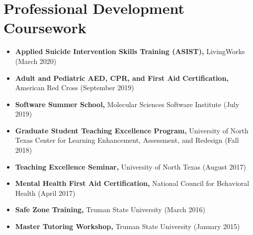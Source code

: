 \documentclass[letterpaper,11pt]{article}
\newcommand{\resumeItem}[2]{
  \item\small{
    \textbf{#1}{ #2 \vspace{-2pt}}
  }
}
\newcommand{\resumeSubItem}[2]{\resumeItem{#1}{#2}\vspace{-4pt}}
\newcommand{\resumeSubHeadingListStart}{\begin{itemize}[leftmargin=*]}
\newcommand{\resumeSubHeadingListEnd}{\end{itemize}}
\begin{document}
\section{Professional Development Coursework}
  \resumeSubHeadingListStart
    \resumeSubItem{Applied Suicide Intervention Skills Training (ASIST)\textnormal{,}}
      {LivingWorks (March 2020)}
    \resumeSubItem{Adult and Pediatric AED, CPR, and First Aid Certification\textnormal{,}}
      {American Red Cross (September 2019)}
    \resumeSubItem{Software Summer School\textnormal{,}}
      {Molecular Sciences Software Institute (July 2019)}
    \resumeSubItem{Graduate Student Teaching Excellence Program\textnormal{,}}
      {University of North Texas Center for Learning Enhancement, Assessment, and Redesign (Fall 2018)}  
    \resumeSubItem{Teaching Excellence Seminar\textnormal{,}}
      {University of North Texas (August 2017)}
    \resumeSubItem{Mental Health First Aid Certification\textnormal{,}}
      {National Council for Behavioral Health (April 2017)}
    \resumeSubItem{Safe Zone Training\textnormal{,}}
      {Truman State University (March 2016)}
    \resumeSubItem{Master Tutoring Workshop\textnormal{,}}
      {Truman State University (January 2015)}
  \resumeSubHeadingListEnd
\end{document}
